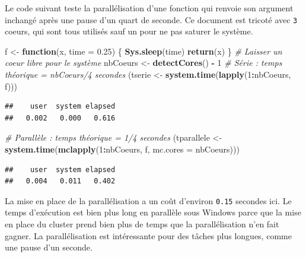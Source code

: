 \documentclass[
  12pt,
  french,
  a4paper,
  extrafontsizes,onecolumn,openright
  ]{memoir}
\newenvironment{Shaded}{\begin{snugshade}}{\end{snugshade}}
\newcommand{\CommentTok}[1]{\textcolor[rgb]{0.56,0.35,0.01}{\textit{#1}}}
\newcommand{\ControlFlowTok}[1]{\textcolor[rgb]{0.13,0.29,0.53}{\textbf{#1}}}
\newcommand{\DataTypeTok}[1]{\textcolor[rgb]{0.13,0.29,0.53}{#1}}
\newcommand{\DecValTok}[1]{\textcolor[rgb]{0.00,0.00,0.81}{#1}}
\newcommand{\FloatTok}[1]{\textcolor[rgb]{0.00,0.00,0.81}{#1}}
\newcommand{\KeywordTok}[1]{\textcolor[rgb]{0.13,0.29,0.53}{\textbf{#1}}}
\newcommand{\NormalTok}[1]{#1}
\newcommand{\OperatorTok}[1]{\textcolor[rgb]{0.81,0.36,0.00}{\textbf{#1}}}
\newcommand{\StringTok}[1]{\textcolor[rgb]{0.31,0.60,0.02}{#1}}
\begin{document}
\normalsize

Le code suivant teste la parallélisation d'une fonction qui renvoie son argument inchangé après une pause d'un quart de seconde.
Ce document est tricoté avec \texttt{3} coeurs, qui sont tous utilisés sauf un pour ne pas saturer le système.

\scriptsize

\begin{Shaded}
\begin{Highlighting}[]
\NormalTok{f <-}\StringTok{ }\ControlFlowTok{function}\NormalTok{(x, }\DataTypeTok{time =} \FloatTok{0.25}\NormalTok{) \{}
    \KeywordTok{Sys.sleep}\NormalTok{(time)}
    \KeywordTok{return}\NormalTok{(x)}
\NormalTok{\}}
\CommentTok{# Laisser un coeur libre pour le système}
\NormalTok{nbCoeurs <-}\StringTok{ }\KeywordTok{detectCores}\NormalTok{() }\OperatorTok{-}\StringTok{ }\DecValTok{1}
\CommentTok{# Série : temps théorique = nbCoeurs/4 secondes}
\NormalTok{(tserie <-}\StringTok{ }\KeywordTok{system.time}\NormalTok{(}\KeywordTok{lapply}\NormalTok{(}\DecValTok{1}\OperatorTok{:}\NormalTok{nbCoeurs, f)))}
\end{Highlighting}
\end{Shaded}

\begin{verbatim}
##    user  system elapsed 
##   0.002   0.000   0.616
\end{verbatim}

\begin{Shaded}
\begin{Highlighting}[]
\CommentTok{# Parallèle : temps théorique = 1/4 secondes}
\NormalTok{(tparallele <-}\StringTok{ }\KeywordTok{system.time}\NormalTok{(}\KeywordTok{mclapply}\NormalTok{(}\DecValTok{1}\OperatorTok{:}\NormalTok{nbCoeurs, f, }\DataTypeTok{mc.cores =}\NormalTok{ nbCoeurs)))}
\end{Highlighting}
\end{Shaded}

\begin{verbatim}
##    user  system elapsed 
##   0.004   0.011   0.402
\end{verbatim}

\normalsize

La mise en place de la parallélisation a un coût d'environ \texttt{0.15} secondes ici.
Le temps d'exécution est bien plus long en parallèle sous Windows parce que la mise en place du cluster prend bien plus de temps que la parallélisation n'en fait gagner.
La parallélisation est intéressante pour des tâches plus longues, comme une pause d'un seconde.
\end{document}
